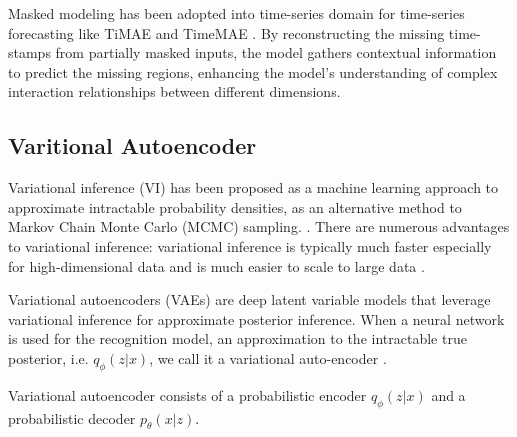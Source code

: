 \documentclass[12pt]{article} %
\begin{document}
Masked modeling has been adopted into time-series domain for time-series forecasting like TiMAE and TimeMAE \citep{li2023ti}\citep{cheng2023timemae}. By reconstructing the missing time-stamps from partially masked inputs, the model gathers contextual information to predict the missing regions, enhancing the model's understanding of complex interaction relationships between different dimensions.

\subsection{Varitional Autoencoder}
Variational inference (VI) has been proposed as a machine learning approach to approximate intractable probability densities, as an alternative method to Markov Chain Monte Carlo (MCMC) sampling. \citep{jordan1999introduction}\citep{Blei_2017}. There are numerous advantages to variational inference: variational inference is typically much faster especially for high-dimensional data and is much easier to scale to large data \citep{Blei_2017}.

Variational autoencoders (VAEs) are deep latent variable models that leverage variational inference for approximate posterior inference. When a neural network is used for the recognition model, an approximation to the intractable true posterior, i.e. $q_{\phi}(z|x)$, we call it a variational auto-encoder \citep{kingma2013auto}. 

Variational autoencoder consists of a probabilistic encoder $q_{\phi}(z|x)$ and a probabilistic decoder $p_{\theta}(x|z)$. 



\end{document}
